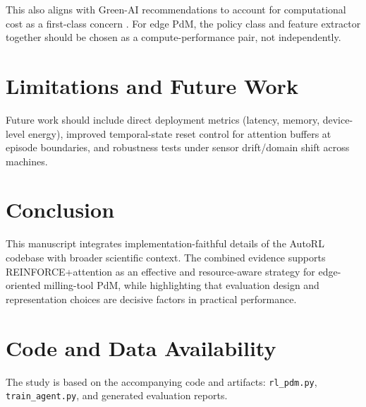 \documentclass[11pt]{article}
\begin{document}
This also aligns with Green-AI recommendations to account for computational cost as a first-class concern \citep{Schwartz2020GreenAI,Strubell2019EnergyPolicy}. For edge PdM, the policy class and feature extractor together should be chosen as a compute-performance pair, not independently.

\section{Limitations and Future Work}
Future work should include direct deployment metrics (latency, memory, device-level energy), improved temporal-state reset control for attention buffers at episode boundaries, and robustness tests under sensor drift/domain shift across machines.

\section{Conclusion}
This manuscript integrates implementation-faithful details of the AutoRL codebase with broader scientific context. The combined evidence supports \textsc{REINFORCE}+attention as an effective and resource-aware strategy for edge-oriented milling-tool PdM, while highlighting that evaluation design and representation choices are decisive factors in practical performance.

\section*{Code and Data Availability}
The study is based on the accompanying code and artifacts: \texttt{rl\_pdm.py}, \texttt{train\_agent.py}, and generated evaluation reports.
\end{document}
